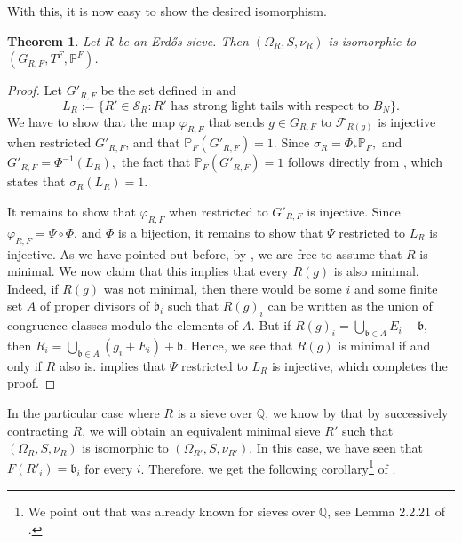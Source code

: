 \documentclass[a4paper,11pt,reqno]{amsart}
\theoremstyle{plain}
\newtheorem{theorem}{Theorem}[section]
\theoremstyle{remark}
\newcommand{\q}{\mathbb{Q}}
\newcommand{\cf}{\mathcal{F}}
\newcommand{\cs}{\mathcal{S}}
\newcommand{\gb}{\mathfrak{b}}
\newcommand{\grf}{G_{R,F}}
\newcommand{\vrf}{\varphi_{R,F}}
\newcommand{\mmp}{\mathbb{P}}
\begin{document}
			With this, it is now easy to show the desired isomorphism.
			
			
			
		
			
			
			
			
			
			
			\begin{theorem}
				\label{thm: main theorem}
				Let $R$ be an Erdős sieve.  Then $(\Omega_R,S,\nu_R)$ is isomorphic to $(\grf,T^F, \mmp^F)$.
			\end{theorem}
			
			\begin{proof}
				Let $G'_{R,F}$ be the set defined in  and $$L_R := \{R'\in\cs_R: R' \text{ has strong light tails with respect to } B_N\}.$$ We have to show that the map $\vrf$ that sends $g \in \grf$ to $\cf_{R(g)}$ is injective when restricted $G'_{R,F}$, and that $\mmp_F(G'_{R,F}) = 1$. Since $\sigma_R = \Phi_*\mmp_F,$ and $G'_{R,F} = \Phi^{-1}(L_R),$ the fact that $\mmp_F(G'_{R,F}) = 1$ follows directly from , which states that $\sigma_R(L_R)=1$. 
				
				It remains to show that $\vrf$ when restricted to $G'_{R,F}$ is injective. Since $\vrf = \Psi \circ \Phi$, and $\Phi$ is a bijection, it remains to show that $\Psi$ restricted to $L_R$  is injective. As we have pointed out before, by , we are free to assume that $R$ is minimal. We now claim that this implies that every $R(g)$ is also minimal. Indeed, if $R(g)$ was not minimal, then there would be some $i$ and some finite set $A$ of proper divisors of $\gb_i$ such that $R(g)_i$ can be written as the union of congruence classes modulo the elements of $A$. But if $R(g)_i = \bigcup_{\gb \in A} E_i + \gb $, then $R_i = \bigcup_{\gb \in A} (g_i+E_i) + \gb $. Hence, we see that $R(g)$ is minimal if and only if $R$ also is.  implies that $\Psi$ restricted to $L_R$  is injective, which completes the proof.
			\end{proof}
			
			In the particular case where $R$ is a sieve over $\q$, we know by   that by successively contracting $R$, we will obtain an equivalent minimal sieve $R'$ such that $(\Omega_R,S,\nu_R)$ is isomorphic to $(\Omega_{R'},S,\nu_{R'})$. In this case, we have seen that $F(R'_i) = \gb_i$ for every $i$. Therefore, we get the following corollary\footnote{We point out that   was already known for sieves over $\q$, see Lemma 2.2.21 of \cite{Kulaga}.} of  .
			
\end{document}
